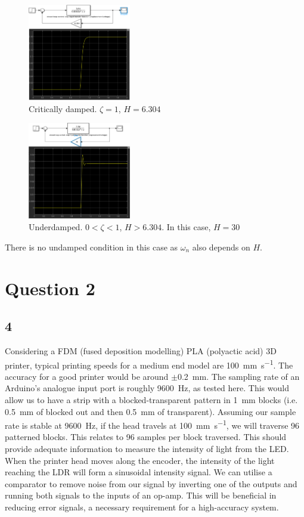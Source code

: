 \documentclass[conference]{IEEEtran}
\begin{document}
\begin{figure}[htbp]
    \centerline{\includegraphics[width = 0.4\textwidth]{../img/q1-12.png}}
    \caption{Critically damped. $\zeta = 1$, $H = 6.304$}
    \label{damp2}
\end{figure}

\begin{figure}[htbp]
    \centerline{\includegraphics[width = 0.4\textwidth]{../img/q1-13.png}}
    \caption{Underdamped. $0 < \zeta < 1$, $H > 6.304$. In this case, $H = 30$}
    \label{damp3}
\end{figure}

There is no undamped condition in this case as $\omega_n$ also depends on $H$.

\section{Question 2}
\subsection{4}
Considering a FDM (fused deposition modelling) PLA (polyactic acid) 3D printer, typical printing speeds \cite{b1} for a medium end model are \SI{100}{\milli\meter\per\second}. The accuracy for a good printer would be around $\pm$\SI{0.2}{\milli\meter}. The sampling rate of an Arduino's analogue input port is roughly \SI{9600}{\hertz}, as tested here. This would allow us to have a strip with a blocked-transparent pattern in \SI{1}{\milli\meter} blocks (i.e. \SI{0.5}{\milli\meter} of blocked out and then \SI{0.5}{\milli\meter} of transparent). Assuming our sample rate is stable at \SI{9600}{\hertz}, if the head travels at \SI{100}{\milli\meter\per\second}, we will traverse 96 patterned blocks. This relates to 96 samples per block traversed. This should provide adequate information to measure the intensity of light from the LED. When the printer head moves along the encoder, the intensity of the light reaching the LDR will form a sinusoidal intensity signal. We can utilise a comparator to remove noise from our signal by inverting one of the outputs and running both signals to the inputs of an op-amp. This will be beneficial in reducing error signals, a necessary requirement for a high-accuracy system. 
\end{document}
